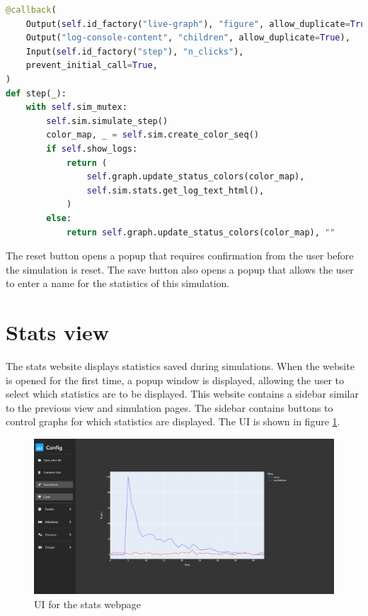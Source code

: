 \begin{lstlisting}[language=python, caption={Callback for advancing simulaton by one step}, label={lst:step_callback}]
@callback(
    Output(self.id_factory("live-graph"), "figure", allow_duplicate=True),
    Output("log-console-content", "children", allow_duplicate=True),
    Input(self.id_factory("step"), "n_clicks"),
    prevent_initial_call=True,
)
def step(_):
    with self.sim_mutex:
        self.sim.simulate_step()
        color_map, _ = self.sim.create_color_seq()
        if self.show_logs:
            return (
                self.graph.update_status_colors(color_map),
                self.sim.stats.get_log_text_html(),
            )
        else:
            return self.graph.update_status_colors(color_map), ""
\end{lstlisting}

The reset button opens a popup that requires confirmation from the user before the simulation is  reset. The save button also opens a popup that allows the user to enter a name for the statistics of this simulation.

\section{Stats view}
The stats website displays statistics saved during simulations. When the website is opened for the first time, a popup window is displayed, allowing the user to select which statistics are to be displayed. This website contains a sidebar similar to the previous view and simulation pages. The sidebar contains buttons to control graphs for which statistics are displayed. The UI is shown in figure \ref{fig:web_stats_view}.

\begin{figure}
    \centering
    \includegraphics[width=0.75\linewidth]{images/web_stats_view.png}
    \caption{UI for the stats webpage}
    \label{fig:web_stats_view}
\end{figure}

